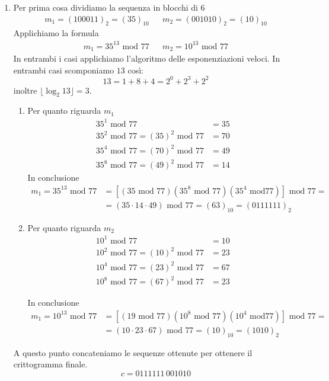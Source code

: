 \begin{framed}
\begin{enumerate}
		\item Per prima cosa dividiamo la sequenza in blocchi di $6$
		\begin{align*}
			m_1 = (100011)_2=(35)_{10} && m_2=(001010)_2=(10)_{10}
		\end{align*}
		Applichiamo la formula 
		\begin{align*}
			m_1 ={35}^{13} \text{ mod }77&&m_2={10}^{13}\text{ mod }77
		\end{align*}
		In entrambi i casi applichiamo l'algoritmo delle esponenziazioni veloci.  In entrambi casi scomponiamo $13$ così:
		$$13=1+8+4=2^0+2^3+2^2$$
		inoltre $\lfloor \log_2 13 \rfloor=3$.
		\begin{enumerate}
			\item Per quanto riguarda $m_1$
			\begin{align*}
				{35}^1 \text{ mod }77&=35\\
				35^2 \text{ mod }77=(35)^2 \text{ mod }77&=70\\
				35^4 \text{ mod }77=(70)^2 \text{ mod }77&=49\\
				35^8 \text{ mod }77=(49)^2 \text{ mod }77&=14
			\end{align*}
			In conclusione
			\begin{align*}
				m_1 ={35}^{13} \text{ mod }77&=\left[(35 \text{ mod } 77)(35^8 \text{ mod }77)(35^4 \text{ mod}77)\right] \text{ mod }77=
				\\&=(35 \cdot 14 \cdot 49) \text{ mod }77=(63)_{10}=(0111111)_2
			\end{align*}	
			\item Per quanto riguarda $m_2$
			\begin{align*}
				{10}^1 \text{ mod }77&=10\\
				10^2 \text{ mod }77=(10)^2 \text{ mod }77&=23\\
				10^4 \text{ mod }77=(23)^2 \text{ mod }77&=67\\
				10^8 \text{ mod }77=(67)^2 \text{ mod }77&=23
			\end{align*}
			
			In conclusione
			\begin{align*}
				m_1 ={10}^{13} \text{ mod }77&=\left[(19 \text{ mod } 77)(10^8 \text{ mod }77)(10^4 \text{ mod}77)\right] \text{ mod }77=
				\\&=(10 \cdot 23 \cdot 67) \text{ mod }77=(10)_{10}=(1010)_2
			\end{align*}	
		\end{enumerate}
		A questo punto concateniamo le sequenze ottenute per ottenere il crittogramma finale.
		$$c=0111111\,001010$$
	\end{enumerate}
\end{framed} 

